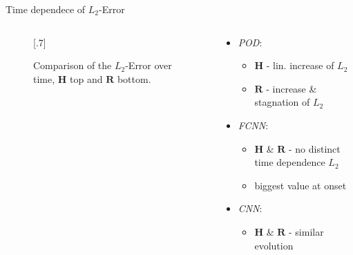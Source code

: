 \documentclass[usenames,dvipsnames,Nike,mathserif]{tuberlinbeamer}
\begin{document}
\begin{frame}[fragile]{Time dependece of $L_2$-Error}
	\begin{columns}
		\begin{column}{.61\textwidth}
			\begin{figure}
				\scalebox{.7}[.7]{}
				\caption{
					Comparison of the $L_2$-Error over time, $\mathbf{H}$ top and $\mathbf{R}$ bottom.}
			\end{figure}
		\end{column}
		\begin{column}{.39\textwidth}
			\begin{itemize}
				\item\emph{POD}:
				\begin{itemize}
					\item $\mathbf{H}$ - lin. increase of $L_2$
					\item $\mathbf{R}$ - increase \& stagnation of $L_2$
				\end{itemize}
				\item\emph{FCNN}:
				\begin{itemize}
					\item $\mathbf{H}$ \& $\mathbf{R}$ - no distinct time dependence $L_2$
					\item biggest value at onset  
				\end{itemize}
				\item\emph{CNN}:
				\begin{itemize}
					\item $\mathbf{H}$ \& $\mathbf{R}$ - similar evolution
				\end{itemize}
			\end{itemize}
		\end{column}
	\end{columns}
\end{frame}
\end{document}
